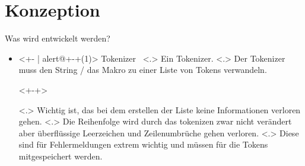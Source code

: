 \section{Konzeption}
  \begin{frame}{Was wird entwickelt werden?}
    \begin{itemize}[<+- | alert@+>]
      \item<+- | alert@+-+(1)>
        Tokenizer~%
            \note[item]<.>{
              Ein Tokenizer.
            }
            \note[item]<.>{
              Der Tokenizer muss den String / das Makro zu einer Liste von Tokens verwandeln.
            }
        \begin{uncoverenv}<+-+>%
        \end{uncoverenv}%
            \note[item]<.>{
              Wichtig ist, das bei dem erstellen der Liste keine Informationen verloren gehen.
            }
            \note[item]<.>{
              Die Reihenfolge wird durch das tokenizen zwar nicht verändert aber überflüssige Leerzeichen und Zeilenumbrüche gehen verloren.
            }
            \note[item]<.>{
              Diese sind für Fehlermeldungen extrem wichtig und müssen für die Tokens mitgespeichert werden.
            }


\end{itemize}
\end{frame}
